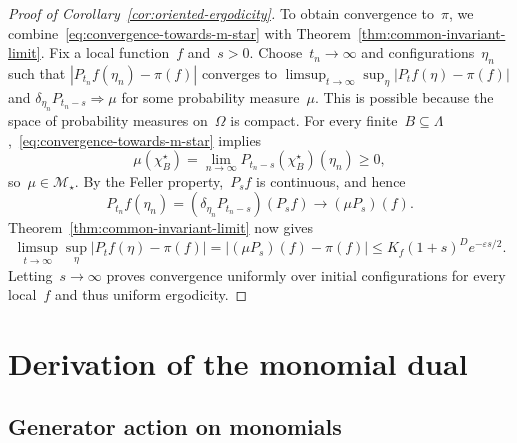 \documentclass[EJP,preprint,NODS,nobera]{ejpecp}
\newcommand{\abs}[1]{\left|#1\right|}
\begin{document}
\begin{proof}[Proof of Corollary~\ref{cor:oriented-ergodicity}]
To obtain convergence to~$\pi$, we combine~\eqref{eq:convergence-towards-m-star}
with Theorem~\ref{thm:common-invariant-limit}.
Fix a local function~$f$ and~$s>0$. Choose~$t_n\to\infty$ and
configurations~$\eta_n$ such that
$\abs{P_{t_n}f(\eta_n)-\pi(f)}$ converges to
$\limsup_{t\to\infty}\sup_\eta\abs{P_tf(\eta)-\pi(f)}$ and
$\delta_{\eta_n}P_{t_n-s}\Rightarrow\mu$ for some probability measure~$\mu$. This is possible because the space of probability measures on~$\Omega$ is compact.
For every finite~$B\subseteq\Lambda$,~\eqref{eq:convergence-towards-m-star} implies
\begin{equation*}
\mu(\chi_B^\star)
=\lim_{n\to\infty}P_{t_n-s}(\chi_B^\star)(\eta_n)\geq0,
\end{equation*}
so~$\mu\in\mathcal M_\star$. By the Feller property,~$P_sf$ is continuous,
and hence
\begin{equation*}
P_{t_n}f(\eta_n)
=(\delta_{\eta_n}P_{t_n-s})(P_sf)
\longrightarrow(\mu P_s)(f).
\end{equation*}
Theorem~\ref{thm:common-invariant-limit} now gives
\begin{equation*}
\limsup_{t\to\infty}\sup_\eta\abs{P_tf(\eta)-\pi(f)}
=\abs{(\mu P_s)(f)-\pi(f)}
\leq K_f(1+s)^D e^{-\varepsilon s/2}.
\end{equation*}
Letting~$s\to\infty$ proves convergence uniformly over initial
configurations for every local~$f$ and thus uniform ergodicity.

\par
\end{proof}

\appendix

\iffalse
\section{Derivation of the monomial dual}
\label{app:dual-calculation}

\subsection{Generator action on monomials}
\label{app:generator-action}
\end{document}
